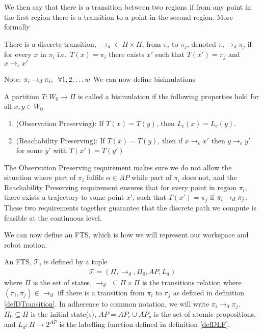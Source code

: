We then say that there is a transition between two regions if from any point in the first region there is a transition to a point in the second region. More formally

\theoremstyle{definition}
\begin{definition}
\label{defDTransition}
There is a discrete transition, $\rightarrow_d \subset \Pi \times \Pi$, from $\pi_i$ to $\pi_j$, denoted $\pi_i \rightarrow_d \pi_j$ if for every $x$ in $\pi_i$ i.e.\ $T(x) = \pi_i$ there exists $x'$ such that $T(x')=\pi_j$ and $x \rightarrow_c x'$
\end{definition}
Note: $\pi_i \rightarrow_d \pi_i, \hspace{0.2cm} \forall 1,2,\dots w$
We can now define bisimulations
\theoremstyle{definition}
\begin{definition}
\label{def:bisim}
A partition $T:W_0\rightarrow \Pi$ is called a bisimulation \cite{fainekos09} if the following properties hold for all $x,y \in W_0$
\begin{enumerate}
    \item (Observation Preserving): If $T(x)=T(y)$, then $L_c(x) = L_c(y)$.
    \item (Reachability Preserving): If $T(x) = T(y)$, then if $x\rightarrow_c x'$ then $y \rightarrow_c y'$ for some $y'$ with $T(x')=T(y')$
\end{enumerate}
\end{definition}

The Observation Preserving requirement makes sure we do not allow the situation where part of $\pi_i$ fulfils $\alpha \in AP$ while part of $\pi_i$ does not, and the Reachability Preserving requirement ensures that for every point in region $\pi_i$, there exists a trajectory to some point $x'$, such that $T(x') = \pi_j$ if $\pi_i \nobreak \rightarrow_d \pi_j$. These two requirements together guarantee that the discrete path we compute is feasible at the continuous level.


We can now define an FTS, which is how we will represent our workspace and robot motion.
\theoremstyle{definition}
\begin{definition}
\label{defFTS}
An FTS, $\mathcal{T}$, is defined by a tuple 
\begin{align*}
\mathcal{T} = (\Pi, \rightarrow_d, \Pi_0, AP,L_d)
\end{align*}
where $\Pi$ is the set of states, $\rightarrow_d$ $ \subseteq \Pi \times \Pi$ is the transitions relation where $(\pi_i,\pi_j) \in \rightarrow_d$ iff there is a transition from $\pi_i$ to $\pi_j$ as defined in definition \ref{defDTransition}. In adherence to common notation, we will write $\pi_i \rightarrow_d \pi_j$. $\Pi_0 \subseteq \Pi$ is the initial state(s), $AP=AP_r \cup AP_p$ is the set of atomic propositions, and $L_d: \Pi \rightarrow 2^{AP}$ is the labelling function defined in definition \ref{defDLF}.
\end{definition}


